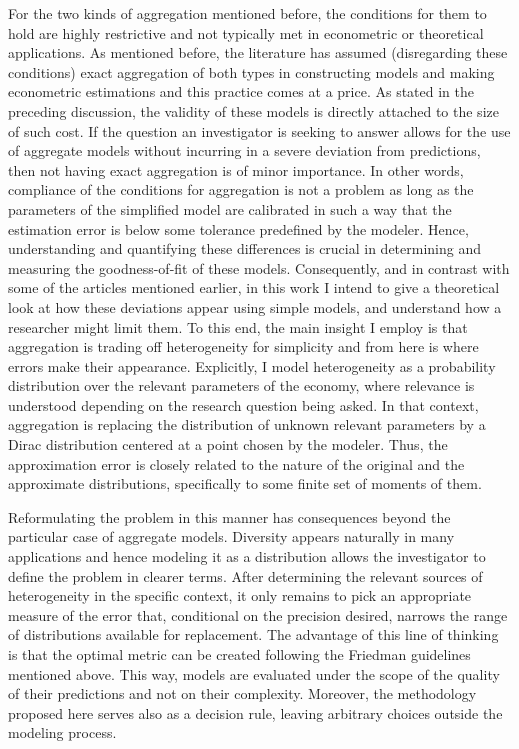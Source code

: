 \documentclass[english, a4paper, 12pt]{article}
\begin{document}
For the two kinds of aggregation mentioned before, the conditions for them to hold are highly restrictive and not typically met in econometric or theoretical applications. As mentioned before, the literature has assumed (disregarding these conditions) exact aggregation of both types in constructing models and making econometric estimations and this practice comes at a price. As stated in the preceding discussion, the validity of these models is directly attached to the size of such cost. If the question an investigator is seeking to answer allows for the use of aggregate models without incurring in a severe deviation from predictions, then not having exact aggregation is of minor importance. In other words, compliance of the conditions for aggregation is not a problem as long as the parameters of the simplified model are calibrated in such a way that the estimation error is below some tolerance predefined by the modeler. Hence, understanding and quantifying these differences is crucial in determining and measuring the goodness-of-fit of these models. Consequently, and in contrast with some of the articles mentioned earlier, in this work I intend to give a theoretical look at how these deviations appear using simple models, and understand how a researcher might limit them. To this end, the main insight I employ is that aggregation is trading off heterogeneity for simplicity and from here is where errors make their appearance. Explicitly, I model heterogeneity as a probability distribution over the relevant parameters of the economy, where relevance is understood depending on the research question being asked. In that context, aggregation is replacing the distribution of unknown relevant parameters by a Dirac distribution centered at a point chosen by the modeler. Thus, the approximation error is closely related to the nature of the original and the approximate distributions, specifically to some finite set of moments of them.

Reformulating the problem in this manner has consequences beyond the particular case of aggregate models. Diversity appears naturally in many applications and hence modeling it as a distribution allows the investigator to define the problem in clearer terms. After determining the relevant sources of heterogeneity in the specific context, it only remains to pick an appropriate measure of the error that, conditional on the precision desired, narrows the range of distributions available for replacement. The advantage of this line of thinking is that the optimal metric can be created following the Friedman guidelines mentioned above. This way, models are evaluated under the scope of the quality of their predictions and not on their complexity. Moreover, the methodology proposed here serves also as a decision rule, leaving arbitrary choices outside the modeling process.
\end{document}
